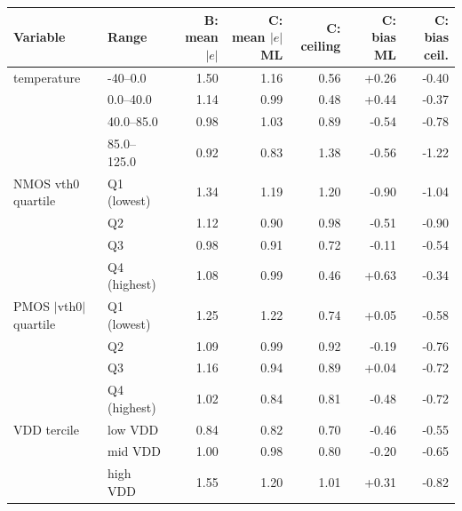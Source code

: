\begin{tabular}{llrrrrr}
\toprule
Variable & Range & B: mean $|e|$ & C: mean $|e|$ ML & C: ceiling & C: bias ML & C: bias ceil. \\
\midrule
temperature & -40--0.0 & 1.50 & 1.16 & 0.56 & +0.26 & -0.40 \\
 & 0.0--40.0 & 1.14 & 0.99 & 0.48 & +0.44 & -0.37 \\
 & 40.0--85.0 & 0.98 & 1.03 & 0.89 & -0.54 & -0.78 \\
 & 85.0--125.0 & 0.92 & 0.83 & 1.38 & -0.56 & -1.22 \\
\midrule
NMOS vth0 quartile & Q1 (lowest) & 1.34 & 1.19 & 1.20 & -0.90 & -1.04 \\
 & Q2 & 1.12 & 0.90 & 0.98 & -0.51 & -0.90 \\
 & Q3 & 0.98 & 0.91 & 0.72 & -0.11 & -0.54 \\
 & Q4 (highest) & 1.08 & 0.99 & 0.46 & +0.63 & -0.34 \\
\midrule
PMOS $|$vth0$|$ quartile & Q1 (lowest) & 1.25 & 1.22 & 0.74 & +0.05 & -0.58 \\
 & Q2 & 1.09 & 0.99 & 0.92 & -0.19 & -0.76 \\
 & Q3 & 1.16 & 0.94 & 0.89 & +0.04 & -0.72 \\
 & Q4 (highest) & 1.02 & 0.84 & 0.81 & -0.48 & -0.72 \\
\midrule
VDD tercile & low VDD & 0.84 & 0.82 & 0.70 & -0.46 & -0.55 \\
 & mid VDD & 1.00 & 0.98 & 0.80 & -0.20 & -0.65 \\
 & high VDD & 1.55 & 1.20 & 1.01 & +0.31 & -0.82 \\
\bottomrule
\end{tabular}
